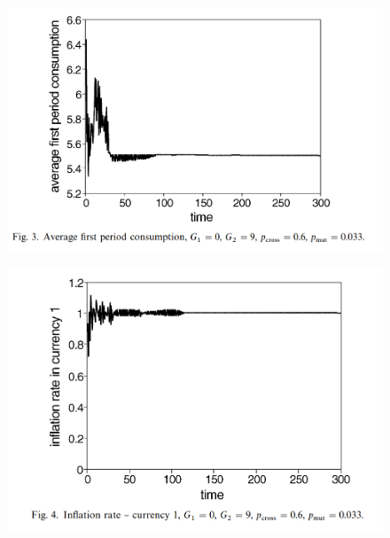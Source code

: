 \begin{frame}

    \begin{figure}
        \includegraphics[width = \textwidth]{fig/large_c.png}
    \end{figure}

\end{frame}

\begin{frame}

    \begin{figure}
        \includegraphics[width = \textwidth]{fig/large_i.png}
    \end{figure}

\end{frame}

